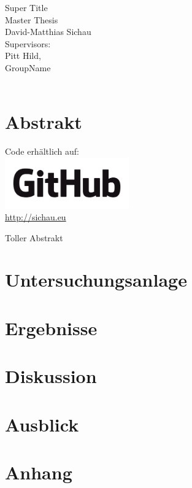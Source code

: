 \documentclass[12pt,oneside,  DIV13]{scrbook}
\newcommand{\github}[1] {
  \begin{mdframed}
  \begin{center}
  Code erhältlich auf:\\
  \href{#1}{
    \includegraphics[width=0.4\textwidth]{graphics/GitHubLogo.png}
    }\\
    \vspace{-0.3cm}
    {\tiny \href{#1}{#1}}
  \end{center}
  
  \end{mdframed}
}
\begin{document}
\frontmatter

\begin{titlepage}
	\vspace*{2cm}
	\begin{center}
		{\LARGE Super Title \vspace*{2cm}\\ Master Thesis\\}
		\vspace*{2cm}\large David-Matthias Sichau \\
		\vspace*{1.5cm} Supervisors:\\ Pitt Hild, \\
		\vspace*{1cm} GroupName\\
		\vspace*{2cm}{\large 24. September 2014, Zürich}\\
	\end{center}
\end{titlepage}



\frontmatter 
\tableofcontents



\chapter*{Abstrakt}




\github{http://sichau.eu}


Toller Abstrakt

\mainmatter









\chapter{Untersuchungsanlage}

\chapter{Ergebnisse}

\chapter{Diskussion}

\chapter{Ausblick}


\appendix 



\backmatter	

\printbibliography

\chapter{Anhang}
\end{document}
